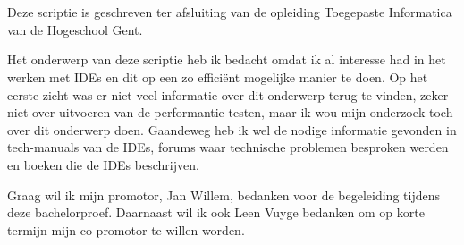 
\chapter*{}
\label{ch:voorwoord}


Deze scriptie is geschreven ter afsluiting van de opleiding Toegepaste Informatica van de Hogeschool Gent.

Het onderwerp van deze scriptie heb ik bedacht omdat ik al interesse had in het werken met IDEs en dit op een zo efficiënt mogelijke manier te doen. Op het eerste zicht was er niet veel informatie over dit onderwerp terug te vinden, zeker niet over uitvoeren van de performantie testen, maar ik wou mijn onderzoek toch over dit onderwerp doen. Gaandeweg heb ik wel de nodige informatie gevonden in tech-manuals van de IDEs, forums waar technische problemen besproken werden en boeken die de IDEs beschrijven.

Graag wil ik mijn promotor, Jan Willem, bedanken voor de begeleiding tijdens
deze bachelorproef. Daarnaast wil ik ook Leen Vuyge bedanken om op korte termijn mijn co-promotor te willen worden.
